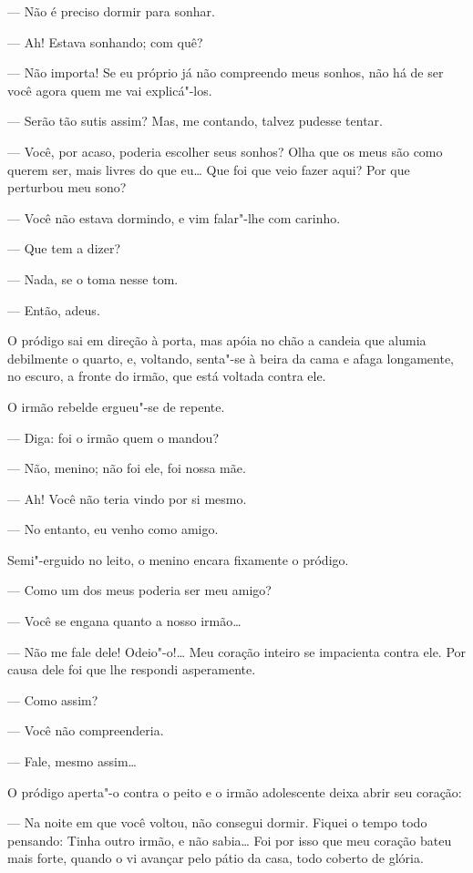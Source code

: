 --- Não é preciso dormir para sonhar.

--- Ah! Estava sonhando; com quê?

--- Não importa! Se eu próprio já não compreendo meus sonhos, não há de
ser você agora quem me vai explicá"-los.

--- Serão tão sutis assim? Mas, me contando, talvez pudesse tentar.

--- Você, por acaso, poderia escolher seus sonhos? Olha que os meus são
como querem ser, mais livres do que eu\ldots{} Que foi que veio fazer aqui?
Por que perturbou meu sono?

--- Você não estava dormindo, e vim falar"-lhe com carinho.

--- Que tem a dizer?

--- Nada, se o toma nesse tom.

--- Então, adeus.

O pródigo sai em direção à porta, mas apóia no chão a candeia que alumia
debilmente o quarto, e, voltando, senta"-se à beira da cama e afaga
longamente, no escuro, a fronte do irmão, que está voltada contra ele.

O irmão rebelde ergueu"-se de repente.

--- Diga: foi o irmão quem o mandou?

--- Não, menino; não foi ele, foi nossa mãe.

--- Ah! Você não teria vindo por si mesmo.

--- No entanto, eu venho como amigo.

Semi"-erguido no leito, o menino encara fixamente o pródigo.

--- Como um dos meus poderia ser meu amigo?

--- Você se engana quanto a nosso irmão\ldots{}

--- Não me fale dele! Odeio"-o!\ldots{} Meu coração inteiro se impacienta
contra ele. Por causa dele foi que lhe respondi asperamente.

--- Como assim?

--- Você não compreenderia.

--- Fale, mesmo assim\ldots{}

O pródigo aperta"-o contra o peito e o irmão adolescente deixa abrir seu
coração:

--- Na noite em que você voltou, não consegui dormir. Fiquei o tempo todo
pensando: Tinha outro irmão, e não sabia\ldots{} Foi por isso que meu
coração bateu mais forte, quando o vi avançar pelo pátio da casa, todo
coberto de glória.

